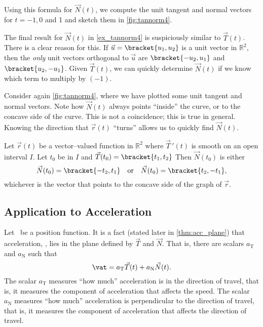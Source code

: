 {Using this formula for $\vec N(t)$, we compute the unit tangent and normal vectors for $t=-1,0$ and 1 and sketch them in \autoref{fig:tannorm4}.}

The final result for $\vec N(t)$ in \autoref{ex_tannorm4} is suspiciously similar to $\vec T(t)$. There is a clear reason for this. If $\vec u =\bracket{u_1,u_2}$ is a unit vector in $\mathbb{R}^2$, then the \textit{only} unit vectors orthogonal to $\vec u$ are $\bracket{-u_2,u_1}$ and $\bracket{u_2,-u_1}$. Given $\vec T(t)$, we can quickly determine $\vec N(t)$ if we know which term to multiply by $(-1)$.

Consider again \autoref{fig:tannorm4}, where we have plotted some unit tangent and normal vectors. Note how $\vec N(t)$ always points ``inside'' the curve, or to the concave side of the curve. This is not a coincidence; this is true in general. Knowing the direction that $\vec r(t)$ ``turns'' allows us to quickly find $\vec N(t)$.


{Let $\vec r(t)$ be a vector--valued function in $\mathbb{R}^2$ where $\vec T\,'(t)$ is smooth on an open interval $I$. Let $t_0$ be in $I$ and $\vec T(t_0) =\bracket{t_1,t_2}$ Then $\vec N(t_0)$ is either
\[\vec N(t_0) =\bracket{-t_2,t_1}\quad \text{or}\quad \vec N(t_0) =\bracket{t_2,-t_1},\]
whichever is the vector that points to the concave side of the graph of $\vec r$.
}

\subsection{Application to Acceleration}

Let \vrt\ be a position function. It is a fact (stated later in \autoref{thm:acc_plane}) %
 that acceleration, \vat, lies in the plane defined by $\vec T$ and $\vec N$. That is, there are scalars $a_{\text{T}}$ and $a_{\text{N}}$ such that 
\[\vat = a_{\text{T}}\vec T(t) + a_{\text{N}}\vec N(t).\]
The scalar $a_{\text{T}}$ measures ``how much'' acceleration is in the direction of travel, that is, it measures the component of acceleration that affects the speed. The scalar $a_{\text{N}}$ measures ``how much'' acceleration is perpendicular to the direction of travel, that is, it measures the component of acceleration that affects the direction of travel.

